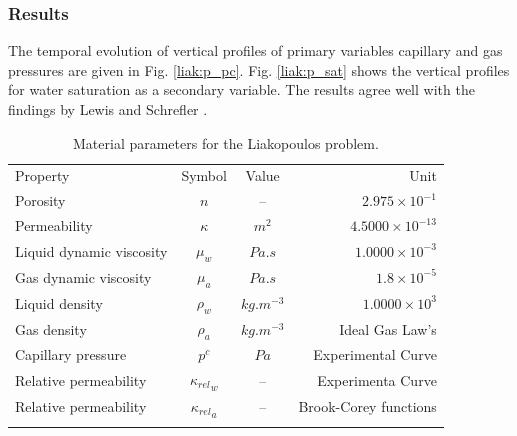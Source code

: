 \subsubsection*{Results}

The temporal evolution of vertical profiles of primary variables capillary and gas pressures are given in Fig. \ref{liak:p_pc}.
Fig. \ref{liak:p_sat} shows the vertical profiles for water saturation as a secondary variable.
The results agree well with the findings by Lewis and Schrefler \cite{LewSch:98}.

\begin{table}[!htb]
\begin{tabular}{lccr}
\hline\hline\noalign{\smallskip}
Property & Symbol & Value & Unit \\
\noalign{\smallskip}\hline\noalign{\smallskip}
Porosity & $n$ & -- & $2.975\times10^{-1}$ \\
Permeability & $\kappa$ & $ m^2$ & $4.5000\times 10^{-13}$ \\
Liquid dynamic viscosity &  $\mu_w$ & $Pa.s$ & $1.0000\times10^{-3}$ \\
Gas dynamic viscosity & $\mu_a$ & $Pa.s$ & $1.8\times10^{-5}$ \\
Liquid density &  $\rho_w$ &$kg.m^{-3}$ & $1.0000\times10^{3}$ \\
Gas density &  $\rho_a$ & $kg.m^{-3}$ & Ideal Gas Law's \\
Capillary pressure & $p^c$ & $Pa$ & Experimental Curve \\
Relative permeability & ${\kappa_{rel}}_{w}$ & -- & Experimenta Curve\\
Relative permeability & ${\kappa_{rel}}_{a}$ & -- & Brook-Corey functions \\
\noalign{\smallskip}\hline\hline
\end{tabular}
\caption{Material parameters for the Liakopoulos problem.}
\end{table}


